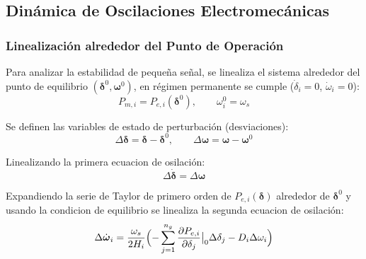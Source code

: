

 \subsection{Dinámica de Oscilaciones Electromecánicas}
 \subsubsection{Linealización alrededor del Punto de Operación}

 Para analizar la estabilidad de pequeña señal, se linealiza el sistema alrededor del punto de equilibrio
 $(\boldsymbol{\delta}^0, \boldsymbol{\omega}^0)$, en régimen permanente se cumple ($\dot{\delta}_i = 0$, $\dot{\omega}_i = 0$): 
 \begin{equation}
    P_{m,i} = P_{e,i}(\boldsymbol{\delta}^0), \qquad \omega_i^0 = \omega_s  
 \end{equation}

Se definen las variables de estado de perturbación (desviaciones):
 \begin{equation}
    \Delta\boldsymbol{\delta} = \boldsymbol{\delta} - \boldsymbol{\delta}^0, \qquad
    \Delta\boldsymbol{\omega} = \boldsymbol{\omega} - \boldsymbol{\omega}^0
 \end{equation}


    Linealizando la primera ecuacion de osilación:
    \begin{equation}
        \Delta\dot{\boldsymbol{\delta}} = \Delta\boldsymbol{\omega}
    \end{equation}

 Expandiendo la serie de Taylor de primero orden de $P_{e,i}(\boldsymbol{\delta})$ alrededor de $\boldsymbol{\delta}^0$ y usando la condicion de equilibrio se linealiza la segunda ecuacion de osilación:
 \begin{equation}
    \Delta\dot{\boldsymbol{\omega}}_i = \frac{\omega_s}{2H_i}\Bigl(-\sum_{j=1}^{n_g} \frac{\partial P_{e,i}}{\partial \delta_j}\big|_0 \Delta\delta_j - D_i \Delta\omega_i\Bigr)
  \end{equation}
    



